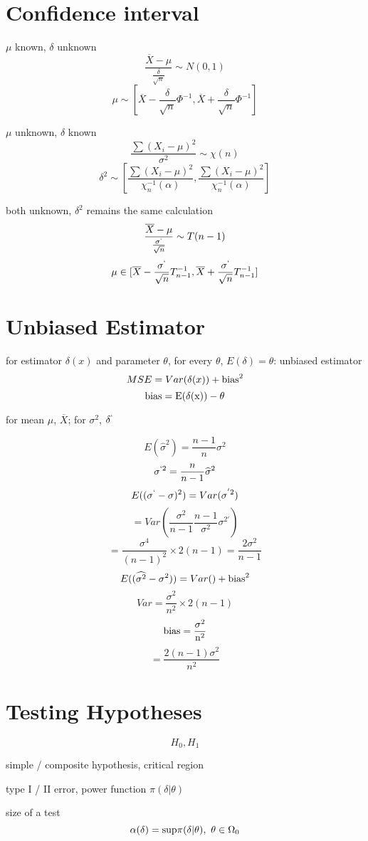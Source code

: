 \documentclass[12pt, a4paper, twocolumn]{article}
\begin{document}
\section*{Confidence interval}

$\mu$ known, $\delta$ unknown 
$$\frac{\overline{X} - \mu}{\frac{\delta}{\sqrt{n}}} \sim N(0, 1)$$
$$\mu \sim [\overline{X} - \frac{\delta}{\sqrt{n}}\Phi^{-1}, \overline{X} + \frac{\delta}{\sqrt{n}}\Phi^{-1}]$$

$\mu$ unknown, $\delta$ known
$$\frac{\sum (X_i - \mu)^2}{\sigma^2} \sim \chi(n)$$
$$\delta^2 \sim [\frac{\sum (X_i - \mu)^2}{\chi_n^{-1}(\alpha)},\frac{\sum (X_i - \mu)^2}{\chi_n^{-1}(\alpha)}]$$

both unknown, $\delta^2$ remains the same calculation
$$\frac{\overline{X} - \mu}{\frac{\sigma^`}{\sqrt{n}}} \sim T(n - 1)$$
$$\mu \in [\overline{X} - \frac{\sigma^`}{\sqrt{n}}T_{n - 1}^{-1}, \overline{X} + \frac{\sigma^`}{\sqrt{n}}T_{n - 1}^{-1}]$$

\section*{Unbiased Estimator}
for estimator $\delta(x)$ and parameter $\theta$, for every $\theta$, $E(\delta) = \theta$: unbiased estimator 
$$MSE = Var(\delta(x)) + \rm{bias} ^ 2$$
$$\rm{bias} = E(\delta(x)) - \theta$$

for mean $\mu$, $\overline{X}$; for $\sigma^2$, $\delta^`$

$$E(\widehat{\sigma}^2) = \frac{n - 1}{n}\sigma^2$$
$$\sigma^{`2} = \frac{n}{n - 1}\widehat{\sigma}^2$$
$$E((\sigma^` - \sigma)^2) = Var(\sigma^{'2})$$
$$ = Var(\frac{\sigma^2}{n - 1}\frac{n - 1}{\sigma^2}\sigma^{2'})$$
$$ = \frac{\sigma^4}{(n - 1)^2}\times 2(n - 1) = \frac{2\sigma^2}{n - 1}$$
$$E((\widehat{\sigma^2} - \sigma^2)) = Var() + \rm{bias}^2$$
$$Var = \frac{\sigma^2}{n^2} \times 2(n - 1)$$
$$\rm{bias} = \frac{\sigma^2}{n^2} $$
$$ = \frac{2(n - 1)\sigma^2}{n^2}$$

\section*{Testing Hypotheses}
$$H_0, H_1$$

simple / composite hypothesis, critical region 

type I / II error, power function $\pi(\delta|\theta)$

size of a test $$\alpha(\delta) = \rm{sup} \pi(\delta|\theta),\ \theta \in \Omega_0$$
\end{document}

